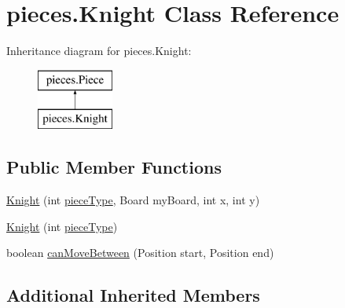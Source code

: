 \hypertarget{classpieces_1_1_knight}{\section{pieces.\-Knight Class Reference}
\label{classpieces_1_1_knight}
}
Inheritance diagram for pieces.\-Knight\-:\begin{figure}[H]
\begin{center}
\leavevmode
\includegraphics[height=2.000000cm]{classpieces_1_1_knight}
\end{center}
\end{figure}
\subsection*{Public Member Functions}
\begin{DoxyCompactItemize}
\item 
\hyperlink{classpieces_1_1_knight_ae733eecc6297202b8430d391941c6ef9}{Knight} (int \hyperlink{classpieces_1_1_piece_ae40d6201d0aed36f369dd9d8f55892e3}{piece\-Type}, Board my\-Board, int x, int y)
\item 
\hyperlink{classpieces_1_1_knight_abbd52d0308ba15b0a68ce3270c536991}{Knight} (int \hyperlink{classpieces_1_1_piece_ae40d6201d0aed36f369dd9d8f55892e3}{piece\-Type})
\item 
boolean \hyperlink{classpieces_1_1_knight_ae71c97f71f48ceb3301667eda116506f}{can\-Move\-Between} (Position start, Position end)
\end{DoxyCompactItemize}
\subsection*{Additional Inherited Members}


